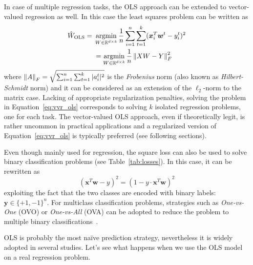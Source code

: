 			In case of multiple regression tasks, the OLS approach can be extended to vector-valued regression as well. In this case the least squares problem can be written as
			\begin{equation} \label{eq:vvr_ols}
				\begin{aligned}
				\hat W_{\text{OLS}}={} & \mathop{\mathrm{argmin}}\limits_{W \in \mathbb{R}^{d \times k}} \frac{1}{n} \sum_{i=1}^n \sum_{t=1}^k (\bm{x}_i^T\bm{w}^t - y_i^t)^2  \\
				& =	\mathop{\mathrm{argmin}}\limits_{W \in \mathbb{R}^{d \times k}} \frac{1}{n} \left\lVert XW - Y\right\rVert_F^2
				\end{aligned}
			\end{equation}
			where $\left\lVert A\right\rVert_F= \sqrt{\sum_{i=1}^n\sum_{t=1}^k |a_i^t|^2}$ is the \textit{Frobenius} norm (also known as  \textit{Hilbert-Schmidt} norm) and it can be considered as an extension of the $\ell_2$-norm to the matrix case.
			Lacking of appropriate regularization penalties, solving the problem in Equation~\eqref{eq:vvr_ols} corresponds to solving $k$ isolated regression problems, one for each task.
			The vector-valued OLS approach, even if theoretically legit, is rather uncommon in practical applications and a regularized version of Equation~\eqref{eq:vvr_ols} is typically preferred (see following sections).

			Even though mainly used for regression, the square loss can also be used to solve binary classification problems (see Table~\ref{tab:losses}). In this case, it can be rewritten as
			\begin{equation} \label{eq:margin_square_loss}
				(\bm{x}^T\bm{w}-y)^2 = (1-y \cdot \bm{x}^T\bm{w})^2
			\end{equation}
			exploiting the fact that the two classes are encoded with binary labels: $\bm{y} \in \{+1,-1\}^n$. For multiclass classification problems, strategies such as \textit{One-vs-One} (\ac{OVO}) or \textit{One-vs-All} (\ac{OVA}) can be adopted to reduce the problem to multiple binary classifications~\cite{hastie2009elements}.

			OLS is probably the most na\"ive prediction strategy, nevertheless it is widely adopted in several studies. Let's see what happens when we use the OLS model on a real regression problem.

